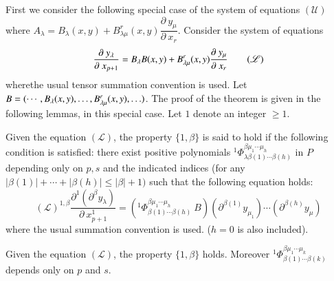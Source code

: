 First we consider the following special case of the system of
equations $(\mathscr{U})$ where $A_\lambda = B_\lambda (x, y) +
B^r_{\lambda\mu}(x, y) \dfrac{\partial ~ y_\mu}{\partial ~
  x_r}$. Consider the system of equations 
\begin{equation}
  \frac{\partial ~y_\lambda}{\partial ~ x_{p+1}} = B_\lambda B(x, y) +
  B^r_{\lambda \mu} (x, y) \frac{\partial ~ y_\mu}{\partial ~ x_r}
  \tag{$\mathscr{L}$} 
\end{equation}
where\pageoriginale the usual tensor summation convention is used. Let  $B = (\cdots,
B_\lambda\break (x, y),  \ldots,  B^r_{\lambda\mu}(x, y), \ldots)$. The
proof of the theorem is given in the following lemmas,  in this
special case. Let $1$ denote an integer $\ge 1$. 

\begin{defi*}%
  Given the equation $(\mathscr{L})$,  the property $\{ 1,  \beta\}$
  is said to hold if the following condition is satisfied: there exist
  positive polynomials $^1\Phi^{\beta\mu_1 \cdots \mu_h}_{\lambda \beta(1)
    \cdots \beta(h)}$ in $P$ depending only on $p, s$ and the
  indicated indices (for any $| \beta (1) | + \cdots + | \beta (h) |
  \le | \beta | + 1)$ such that the following equation holds: 
  $$
  (\mathscr{L})^{1, \beta} \frac{ \partial^1(\partial^\beta
    y_\lambda)}{\partial ~ x^1_{p+1}} = \left({^1{\Phi}}^{\beta \mu_1
    \cdots \mu_h}_{\beta(1) \cdots \beta(h)}  ~ B\right)
  \left(\partial^{\beta(1)} y_{\mu_1}\right) \cdots
  \left(\partial^{\beta(h)} y_\mu\right ) 
  $$
  where the usual summation convention is used. ($h=0$ is also included).
\end{defi*}

\begin{lemma}\label{chap1:sec1.6:lem1}%
  Given the equation $(\mathscr{L})$,  the property $\{ 1, \beta \}$
  holds. Moreover $^1{\Phi}^{\beta \mu_1 \cdots \mu_k}_{\beta(1)
    \cdots \beta(k)}$ depends only on $p$ and $s$. 
\end{lemma}

